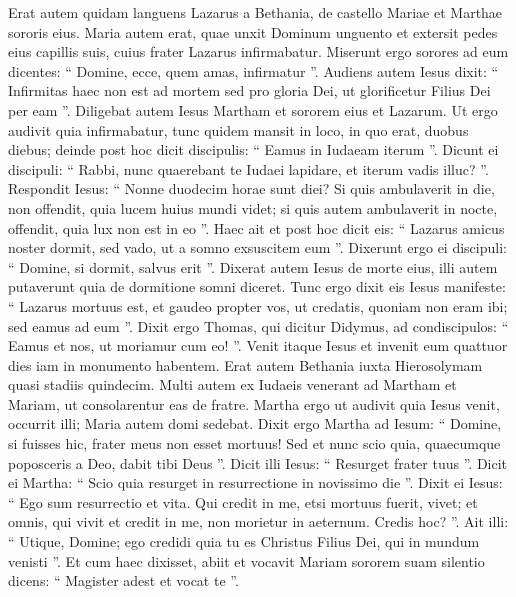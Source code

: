 \begin{biblechapter}
\begin{biblechapter}
\begin{biblechapter}
\begin{biblechapter}
\begin{biblechapter}
\begin{biblechapter}
\begin{biblechapter}
\begin{biblechapter}
\begin{biblechapter}
\begin{biblechapter}
\begin{biblechapter}
\verse Erat autem quidam languens Lazarus a Bethania, de castello Mariae et Marthae sororis eius. 
 \verse Maria autem erat, quae unxit Dominum unguento et extersit pedes eius capillis suis, cuius frater Lazarus infirmabatur. 
\verse Miserunt ergo sorores ad eum dicentes: “ Domine, ecce, quem amas, infirmatur ”.
 \verse Audiens autem Iesus dixit: “ Infirmitas haec non est ad mortem sed pro gloria Dei, ut glorificetur Filius Dei per eam ”. 
\verse Diligebat autem Iesus Martham et sororem eius et Lazarum. 
\verse Ut ergo audivit quia infirmabatur, tunc quidem mansit in loco, in quo erat, duobus diebus; 
\verse deinde post hoc dicit discipulis: “ Eamus in Iudaeam iterum ”. 
\verse Dicunt ei discipuli: “ Rabbi, nunc quaerebant te Iudaei lapidare, et iterum vadis illuc? ”. 
\verse Respondit Iesus: “ Nonne duodecim horae sunt diei? Si quis ambulaverit in die, non offendit, quia lucem huius mundi videt; 
\verse si quis autem ambulaverit in nocte, offendit, quia lux non est in eo ”. 
\verse Haec ait et post hoc dicit eis: “ Lazarus amicus noster dormit, sed vado, ut a somno exsuscitem eum ”. 
 \verse Dixerunt ergo ei discipuli: “ Domine, si dormit, salvus erit ”. 
\verse Dixerat autem Iesus de morte eius, illi autem putaverunt quia de dormitione somni diceret. 
\verse Tunc ergo dixit eis Iesus manifeste: “ Lazarus mortuus est, 
\verse et gaudeo propter vos, ut credatis, quoniam non eram ibi; sed eamus ad eum ”. 
\verse Dixit ergo Thomas, qui dicitur Didymus, ad condiscipulos: “ Eamus et nos, ut moriamur cum eo! ”.
 \verse Venit itaque Iesus et invenit eum quattuor dies iam in monumento habentem. 
 \verse Erat autem Bethania iuxta Hierosolymam quasi stadiis quindecim. 
\verse Multi autem ex Iudaeis venerant ad Martham et Mariam, ut consolarentur eas de fratre. 
 \verse Martha ergo ut audivit quia Iesus venit, occurrit illi; Maria autem domi sedebat. 
\verse Dixit ergo Martha ad Iesum: “ Domine, si fuisses hic, frater meus non esset mortuus! 
\verse Sed et nunc scio quia, quaecumque poposceris a Deo, dabit tibi Deus ”. 
\verse Dicit illi Iesus: “ Resurget frater tuus ”. 
 \verse Dicit ei Martha: “ Scio quia resurget in resurrectione in novissimo die ”. 
 \verse Dixit ei Iesus: “ Ego sum resurrectio et vita. Qui credit in me, etsi mortuus fuerit, vivet; 
\verse et omnis, qui vivit et credit in me, non morietur in aeternum. Credis hoc? ”. 
\verse Ait illi: “ Utique, Domine; ego credidi quia tu es Christus Filius Dei, qui in mundum venisti ”.
 \verse Et cum haec dixisset, abiit et vocavit Mariam sororem suam silentio dicens: “ Magister adest et vocat te ”. 

\end{biblechapter}
\end{biblechapter}
\end{biblechapter}
\end{biblechapter}
\end{biblechapter}
\end{biblechapter}
\end{biblechapter}
\end{biblechapter}
\end{biblechapter}
\end{biblechapter}
\end{biblechapter}
